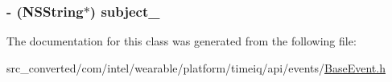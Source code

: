\subsubsection[{subject\+\_\+}]{\setlength{\rightskip}{0pt plus 5cm}-\/ (N\+S\+String$\ast$) subject\+\_\+}\label{interface_base_event_a5afd766b21d39c0f158643038a694fed}


The documentation for this class was generated from the following file\+:\begin{DoxyCompactItemize}
\item 
src\+\_\+converted/com/intel/wearable/platform/timeiq/api/events/\hyperlink{_base_event_8h}{Base\+Event.\+h}\end{DoxyCompactItemize}
